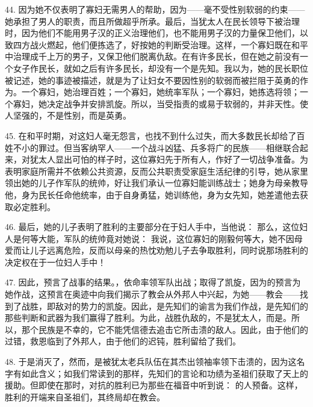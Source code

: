 44. 因为她不仅表明了寡妇无需男人的帮助，因为——毫不受性别软弱的约束——她承担了男人的职责，而且所做超乎所承。最后，当犹太人在民长领导下被治理时，因为他们不能用男子汉的正义治理他们，也不能用男子汉的力量保卫他们，以致四方战火燃起，他们便拣选了，好按她的判断受治理。这样，一个寡妇既在和平中治理成千上万的男子，又保卫他们脱离仇敌。在有许多民长，但在她之前没有一个女子作民长，就如之后有许多民长，却没有一个是先知。我以为，她的民长职位被记述，她的事迹被描述，就是为了让妇女不要因性别的软弱而被拦阻于英勇的作为。一个寡妇，她治理百姓；一个寡妇，她统率军队；一个寡妇，她拣选将领；一个寡妇，她决定战争并安排凯旋。所以，当受指责的或易于软弱的，并非天性。使人坚强的，不是性别，而是英勇。\par

45. 在和平时期，对这妇人毫无怨言，也找不到什么过失，而大多数民长却给了百姓不小的罪过。但当客纳罕人——一个战斗凶猛、兵多将广的民族——相继联合起来，对犹太人显出可怕的样子时，这位寡妇先于所有人，作好了一切战争准备。为表明家庭所需并不依赖公共资源，反而公共职责受家庭生活纪律的引导，她从家里领出她的儿子作军队的统帅，好让我们承认一位寡妇能训练战士；她身为母亲教导他，身为民长任命他统率，由于自身勇猛，她训练他，身为女先知，她差遣他去获取必定胜利。\par

46. 最后，她的儿子表明了胜利的主要部分在于妇人手中，当他说： 那么，这位妇人是何等大能，军队的统帅竟对她说： 我说，这位寡妇的刚毅何等大，她不因母爱而让儿子远离危险，反而以母亲的热忱劝勉儿子去争取胜利，同时说那场胜利的决定权在于一位妇人手中！\par

47. 因此，预言了战事的结果。，依命率领军队出战；取得了凯旋，因为的预言为她作战，这预言在奥迹中向我们揭示了教会从外邦人中兴起，为她——教会——找到了战胜，即敌对的势力的凯旋。因此，是先知们的谕言为我们作战，是先知们的那些判断和武器为我们赢得了胜利。为此，战胜仇敌的，不是犹太人，而是。所以，那个民族是不幸的，它不能凭信德去追击它所击溃的敌人。因此，由于他们的过错，救恩临到了外邦人，由于他们的迟钝，胜利留给了我们。\par

48. 于是消灭了，然而，是被犹太老兵队伍在其杰出领袖率领下击溃的，因为这名字有如此含义；如我们常读到的那样，先知们的言论和功绩为圣祖们获取了天上的援助。但即使在那时，对抗的胜利已为那些在福音中听到说： 的人预备。这样，胜利的开端来自圣祖们，其终局却在教会。\par

